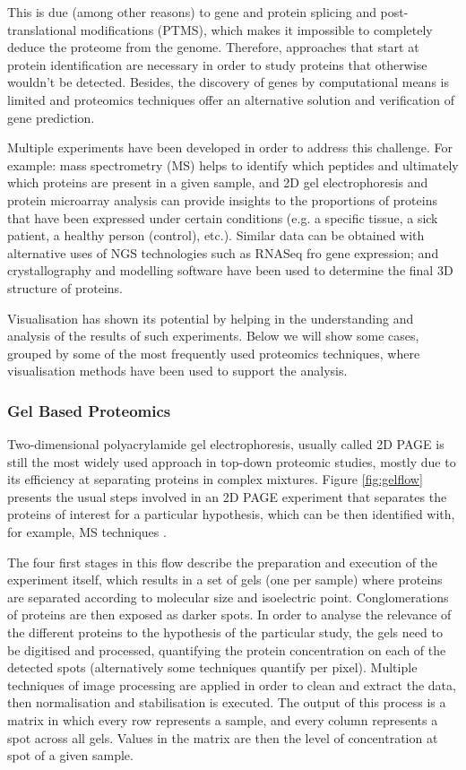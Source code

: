 This is due (among other reasons) to gene and protein splicing and post-translational modifications (PTMS), which makes it impossible to completely deduce the proteome from the genome. Therefore, approaches that start at protein identification are necessary in order to study proteins that otherwise wouldn't be detected. Besides, the discovery of genes by computational means is limited and proteomics techniques offer an alternative solution and verification of gene prediction.

Multiple experiments have been developed in order to address this challenge. For example: mass spectrometry (MS) helps to identify which peptides and ultimately which proteins are present in a given sample, and 2D gel electrophoresis and protein microarray analysis can provide insights to the proportions of proteins that have been expressed under certain conditions (e.g. a specific tissue, a sick patient, a healthy person (control), etc.). Similar data can be obtained with alternative uses of NGS technologies such as RNASeq fro gene expression; and crystallography and modelling software have been used to determine the final 3D structure of proteins.

Visualisation has shown its potential by helping in the understanding and analysis of the results of such experiments. Below we will show some cases, grouped by some of the most frequently used proteomics techniques, where visualisation methods have been used to support the analysis.

\subsubsection{Gel Based Proteomics}
Two-dimensional polyacrylamide gel electrophoresis, usually called 2D PAGE  is still the most widely used approach in top-down proteomic studies, mostly due to its efficiency at separating proteins in complex mixtures. Figure \ref{fig:gelflow} presents the usual steps involved in an 2D PAGE experiment that separates the proteins of interest for a particular hypothesis, which can be then identified with, for example, MS techniques \cite{SIL2014}.

The four first stages in this flow describe the preparation and execution of the experiment itself, which results in a set of gels (one per sample) where proteins are separated according to molecular size and isoelectric point. Conglomerations of proteins are then exposed as darker spots. In order to analyse the relevance of the different proteins to the hypothesis of the particular study, the gels need to be digitised and processed, quantifying the protein concentration on each of the detected spots (alternatively some techniques quantify per pixel). Multiple techniques of image processing are applied in order to clean and extract the data, then normalisation and stabilisation is executed. The output of this process is a matrix in which every row represents a sample, and every column represents a spot across all gels. Values in the matrix are then the level of concentration at spot of a given sample. 

